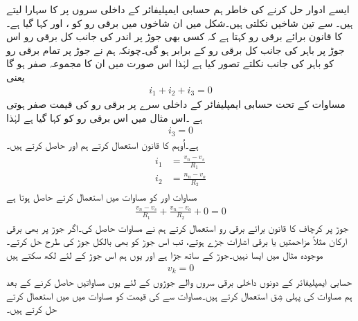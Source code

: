 	ایسے  ادوار حل کرنے کی خاطر ہم حسابی ایمپلیفائر کے داخلی سروں پر   کا سہارا لیتے ہیں۔   سے تین شاخیں نکلتی ہیں۔شکل میں ان شاخوں میں برقی رو کو  ،  اور  کہا گیا ہے۔ کا قانون برائے برقی رو  کہتا ہے کہ کسی بھی جوڑ پر اندر کی جانب کل برقی رو اس جوڑ پر باہر کی جانب کل برقی رو کے برابر ہو گی۔چونکہ ہم نے جوڑ پر تمام برقی رو کو باہر کی جانب نکلتے تصور کیا ہے لہٰذا اس صورت میں ان کا مجموعہ صفر ہو گا یعنی
\begin{align} \label{مساوات_منفی_منفی_مداخل_کے_جوڑ_پر_رو}
i_1+i_2+i_3 = 0
\end{align}
مساوات   کے تحت حسابی ایمپلیفائر کے داخلی سرے پر برقی رو کی قیمت صفر ہوتی ہے ۔اس مثال میں اس برقی رو کو  کہا گیا ہے لہٰذا
\begin{align} \label{مساوات_حسابی_منفی_سرے_پر_صفر_رو}
i_3=0
\end{align}
ہے۔اُوہم کا قانون استعمال کرتے ہم  اور  حاصل کرتے ہیں۔
\begin{gather} 
\begin{aligned}\label{مساوات_منفی_بقایا_داخلی_رو}
i_1& =\frac{v_n-v_s}{R_1}\\
i_2 &=\frac{n_n-v_o}{R_2}
\end{aligned}
\end{gather}
مساوات   اور   کو مساوات   میں استعمال کرتے حاصل ہوتا ہے
\begin{align} \label{مساوات_منفی_کا_حصول}
\frac{v_n - v_s}{R_1}+\frac{v_n-v_o}{R_2}+0=0
\end{align}
	جوڑ  پر کرچاف کا قانون برائے برقی رو استعمال کرتے ہم نے مساوات   حاصل کی۔اگر جوڑ  پر بھی برقی ارکان مثلاً مزاحمتیں یا برقی اشارات جڑے ہوتے، تب اس جوڑ کو بھی بالکل جوڑ  کی طرح حل کرتے۔موجودہ مثال میں ایسا نہیں۔جوڑ   کے ساتھ جڑا ہے اور یوں ہم اس جوڑ کے لئے لکھ سکتے ہیں
\begin{align} \label{مساوات_منفی_مثبت__زمین_پر}
v_k=0
\end{align}
	حسابی ایمپلیفائر کے دونوں داخلی برقی سروں والے جوڑوں کے لئے یوں مساواتیں حاصل کرنے کے بعد ہم مساوات   کی پہلی شِق استعمال کرتے ہیں۔مساوات   سے  کی قیمت کو مساوات   میں  میں استعمال کرتے حل کرتے ہیں۔
